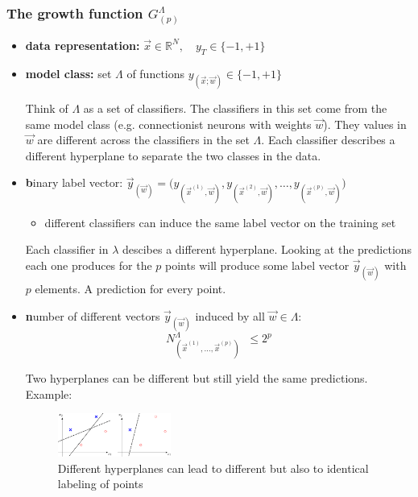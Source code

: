 \begin{frame} \frametitle{The growth function $G_{(p)}^\Lambda$}
	\begin{itemize}
		\item<1> \textbf{data representation:} 
			$\vec{x} \in \mathbb{R}^N, \quad y_T \in \{-1,+1\}$ 
		\vspace{5mm}
		\item<2> \textbf{model class:} 
			set $\Lambda$ of functions $y_{(\vec{x}; \vec{w})} \in \{-1,+1\}$
			
			Think of $\Lambda$ as a set of classifiers.
			The classifiers in this set come from the same model class (e.g. connectionist neurons with weights $\vec w$).
			They values in $\vec w$ are different across the classifiers in the set $\Lambda$.
			Each classifier describes a different hyperplane to separate the two classes in the data.
			
		\vspace{5mm}
		\item<3> {\textbf binary label vector:} $\vec y_{(\vec{w})} = \Big( 
			y_{(\vec{x}^{(1)}, \vec{w})}, 
			y_{(\vec{x}^{(2)}, \vec{w})}, \ldots, 
			y_{(\vec{x}^{(p)}, \vec{w})} \Big)$
			\begin{itemize}	
				\item different classifiers can induce the 
					same label vector on the training set 
			\end{itemize}
			
			Each classifier in $\lambda$ descibes a different hyperplane.
			Looking at the predictions each one produces for the $p$ points will produce some label vector $\vec y_{(\vec{w})}$ with $p$ elements. A prediction for every point.
			
		\vspace{5mm}
		\item<4> {\textbf number} of different vectors $\vec y_{(\vec{w})}$ 
			induced by all $\vec w \in \Lambda$:
			\vspace{-2mm}
			\begin{equation}
				\tag{depends on $\Lambda$ and the sample}
				N_{(\vec{x}^{(1)}, \ldots, \vec{x}^{(p)})}^\Lambda 
				\;\;\leq 2^p 
			\end{equation}
			
		Two hyperplanes can be different but still yield the same predictions.
		Example:\\
		\begin{figure}[h]
			\centering
			\includegraphics[width=0.35\textwidth]{img/uniquepredictions}
			\caption{Different hyperplanes can lead to different but also to identical labeling of points}
		\end{figure}
		

\end{itemize}
\end{frame}
